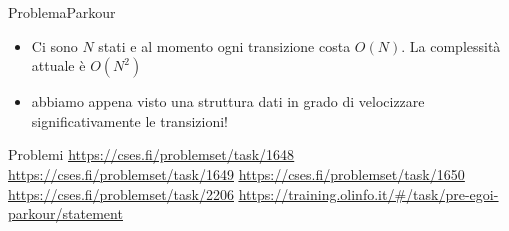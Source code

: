 \documentclass[compress]{beamer}
\begin{document}
\begin{frame}{Problema}{Parkour}
    \vfill
    \begin{itemize}
        \item Ci sono $N$ stati e al momento ogni transizione costa $O(N)$. La complessit\`a attuale \`e $O(N^2)$
        \item abbiamo appena visto una struttura dati in grado di velocizzare significativamente le transizioni!
    \end{itemize}
    \pause
\end{frame}

\begin{frame}{Problemi}
    \small{\underline{\url{https://cses.fi/problemset/task/1648}}}
    \small{\underline{\url{https://cses.fi/problemset/task/1649}}}
    \small{\underline{\url{https://cses.fi/problemset/task/1650}}}
    \small{\underline{\url{https://cses.fi/problemset/task/2206}}}
    \small{\underline{\url{https://training.olinfo.it/\#/task/pre-egoi-parkour/statement}}}
\end{frame}
\end{document}
